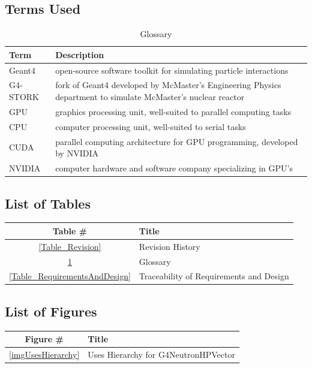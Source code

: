 \documentclass[12pt]{article}
\begin{document}
\subsection{Terms Used}
\begin{table}[h]
\centering
\caption{Glossary}\label{Table_Glossary}
\begin{tabularx}{\textwidth}{lX}
\toprule
\bf Term & \bf Description\\\midrule\vspace{1mm}
Geant4 & open-source software toolkit for simulating particle interactions\\\vspace{1mm}
G4-STORK & fork of Geant4 developed by McMaster's Engineering Physics department to simulate McMaster's nuclear reactor\\\vspace{1mm}
GPU & graphics processing unit, well-suited to parallel computing tasks\\\vspace{1mm}
CPU & computer processing unit, well-suited to serial tasks\\\vspace{1mm}
CUDA & parallel computing architecture for GPU programming, developed by NVIDIA\\\vspace{1mm}
NVIDIA & computer hardware and software company specializing in GPU's\\
\bottomrule
\end{tabularx}
\end{table}

\subsection{List of Tables}
\begin{center}
\begin{tabular}{cl}
\toprule
\bf Table \# & \bf Title\\\midrule
\ref{Table_Revision} & Revision History\\
\ref{Table_Glossary} & Glossary\\
\ref{Table_RequirementsAndDesign} & Traceability of Requirements and Design\\
\bottomrule
\end{tabular}
\end{center}

\subsection{List of Figures}
\begin{center}
\begin{tabular}{cl}
\toprule
\bf Figure \# & \bf Title\\\midrule
\ref{imgUsesHierarchy} & Uses Hierarchy for G4NeutronHPVector\\
\bottomrule
\end{tabular}
\end{center}
\end{document}
